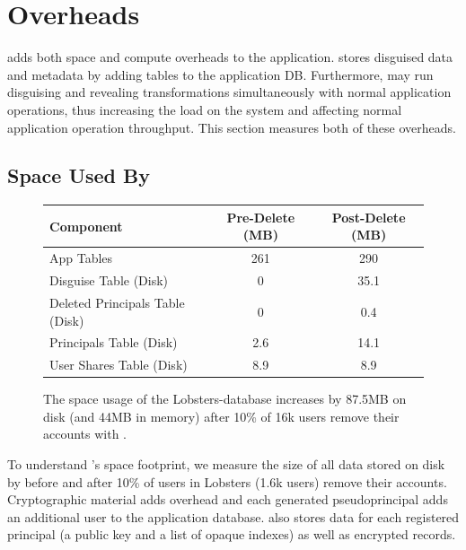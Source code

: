 \section{\sys Overheads}
\label{s:eval-overheads}

\sys adds both space and compute overheads to the application. \sys stores
disguised data and metadata by adding tables to the application DB. Furthermore,
\sys may run disguising and revealing transformations simultaneously with normal
application operations, thus increasing the load on the system and affecting normal
application operation throughput.
%
This section measures both of these overheads.

\subsection{Space Used By \sys}

\begin{figure}[t]
\centering
\begin{tabular}{lcc}
    \textbf{Component} & \textbf{Pre-Delete (MB)} & \textbf{Post-Delete (MB)} \\
\hline
    App Tables & 261 & 290\\
    Disguise Table (Disk) & 0 & 35.1\\
    Deleted Principals Table (Disk) & 0 & 0.4\\
    Principals Table (Disk) & 2.6 & 14.1 \\
    User Shares Table (Disk) & 8.9 & 8.9\\
\end{tabular}
    \caption[Space overhead of \sys.]{The space usage of the Lobsters-\sys database increases by 87.5MB on disk (and 44MB
    in memory) after 10\% of 16k
    users remove their accounts with \sys.}
    \label{f:storage}
\end{figure}

%
To understand \sys's space footprint, we measure the size of all data stored
on disk by \sys before and after 10\% of users in Lobsters (1.6k users)
remove their accounts.
%
%
Cryptographic material adds overhead and each generated pseudoprincipal adds an
additional user to the application database. \sys also stores data for each
registered principal (a public key and a list of opaque indexes) as well as
encrypted records.
%
%

